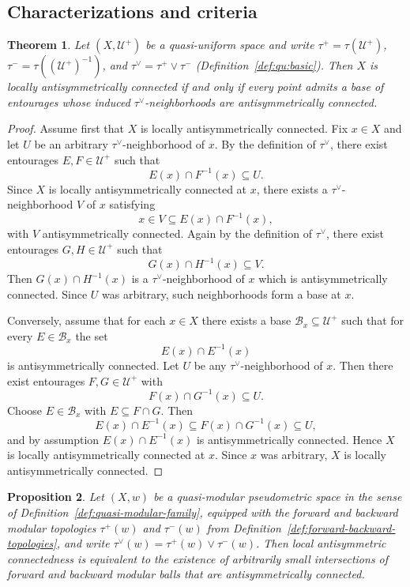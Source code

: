 \documentclass[preprint,12pt]{elsarticle}
\newtheorem{theorem}{Theorem}[section]
\newtheorem{proposition}[theorem]{Proposition}
\begin{document}
\subsection{Characterizations and criteria}
\label{ssec:local-char}

\begin{theorem}
\label{thm:quni-characterization}
Let $(X,\mathcal U^{+})$ be a quasi-uniform space and write
$\tau^{+}=\tau(\mathcal U^{+})$, $\tau^{-}=\tau((\mathcal U^{+})^{-1})$,
and $\tau^\vee=\tau^{+}\vee\tau^{-}$ (Definition~\ref{def:qu:basic}).
Then $X$ is locally antisymmetrically connected if and only if every
point admits a base of entourages whose induced $\tau^\vee$-neighborhoods
are antisymmetrically connected.
\end{theorem}

\begin{proof}
Assume first that $X$ is locally antisymmetrically connected.
Fix $x\in X$ and let $U$ be an arbitrary $\tau^\vee$-neighborhood of $x$.
By the definition of $\tau^\vee$, there exist entourages
$E,F\in\mathcal U^{+}$ such that
\[
E(x)\cap F^{-1}(x)\subseteq U.
\]
Since $X$ is locally antisymmetrically connected at $x$, there exists a
$\tau^\vee$-neighborhood $V$ of $x$ satisfying
\[
x\in V\subseteq E(x)\cap F^{-1}(x),
\]
with $V$ antisymmetrically connected.
Again by the definition of $\tau^\vee$, there exist entourages
$G,H\in\mathcal U^{+}$ such that
\[
G(x)\cap H^{-1}(x)\subseteq V.
\]
Then $G(x)\cap H^{-1}(x)$ is a $\tau^\vee$-neighborhood of $x$ which is
antisymmetrically connected. Since $U$ was arbitrary, such neighborhoods
form a base at $x$.

Conversely, assume that for each $x\in X$ there exists a base
$\mathcal B_x\subseteq\mathcal U^{+}$ such that for every
$E\in\mathcal B_x$ the set
\[
E(x)\cap E^{-1}(x)
\]
is antisymmetrically connected.
Let $U$ be any $\tau^\vee$-neighborhood of $x$.
Then there exist entourages $F,G\in\mathcal U^{+}$ with
\[
F(x)\cap G^{-1}(x)\subseteq U.
\]
Choose $E\in\mathcal B_x$ with $E\subseteq F\cap G$.
Then
\[
E(x)\cap E^{-1}(x)\subseteq F(x)\cap G^{-1}(x)\subseteq U,
\]
and by assumption $E(x)\cap E^{-1}(x)$ is antisymmetrically connected.
Hence $X$ is locally antisymmetrically connected at $x$.
Since $x$ was arbitrary, $X$ is locally antisymmetrically connected.
\end{proof}

\begin{proposition}
\label{prop:modular-ball-char}
Let $(X,w)$ be a quasi-modular pseudometric space in the sense of
Definition~\ref{def:quasi-modular-family}, equipped with the forward and
backward modular topologies $\tau^{+}(w)$ and $\tau^{-}(w)$ from
Definition~\ref{def:forward-backward-topologies}, and write
$\tau^\vee(w)=\tau^{+}(w)\vee\tau^{-}(w)$.
Then local antisymmetric connectedness is equivalent to the existence of
arbitrarily small intersections of forward and backward modular balls
that are antisymmetrically connected.
\end{proposition}
\end{document}
